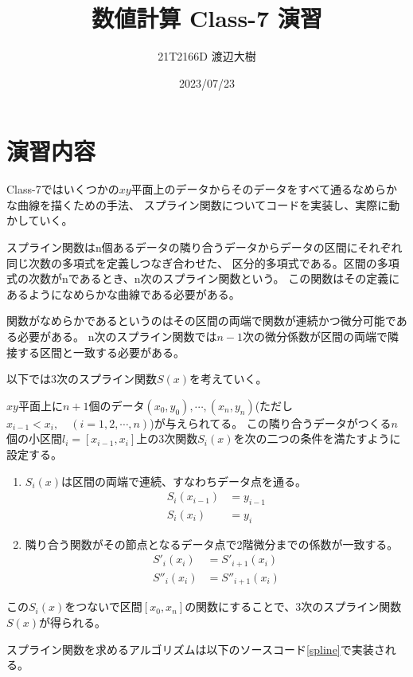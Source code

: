 \documentclass[a4paper,11pt,dvipdfmx]{jsarticle}
\begin{document}

\title{数値計算 Class-7 演習}
\author{21T2166D 渡辺大樹}
\date{2023/07/23}
\maketitle

\section{演習内容}
Class-7ではいくつかの$xy$平面上のデータからそのデータをすべて通るなめらかな曲線を描くための手法、
スプライン関数についてコードを実装し、実際に動かしていく。

スプライン関数はn個あるデータの隣り合うデータからデータの区間にそれぞれ同じ次数の多項式を定義しつなぎ合わせた、
区分的多項式である。区間の多項式の次数がnであるとき、n次のスプライン関数という。
この関数はその定義にあるようになめらかな曲線である必要がある。

関数がなめらかであるというのはその区間の両端で関数が連続かつ微分可能である必要がある。
n次のスプライン関数では$n-1$次の微分係数が区間の両端で隣接する区間と一致する必要がある。

以下では3次のスプライン関数$S(x)$を考えていく。

$xy$平面上に$n+1$個のデータ$(x_0,y_0),\cdots,(x_n,y_n)$(ただし$x_{i-1}<x_i,\quad(i=1,2,\cdots,n)$)が与えられてる。
この隣り合うデータがつくる$n$個の小区間$l_i=[x_{i-1},x_i]$上の3次関数$S_i(x)$を次の二つの条件を満たすように設定する。
\begin{enumerate}
    \item $S_i(x)$は区間の両端で連続、すなわちデータ点を通る。
    \begin{align*}
        S_i(x_{i-1}) & = y_{i-1}\\
        S_i(x_{i}) & = y_{i}
    \end{align*}
    \item 隣り合う関数がその節点となるデータ点で2階微分までの係数が一致する。
    \begin{align*}
        S'_i(x_i) & =S'_{i+1}(x_i) \\
        S''_i(x_i) & =S''_{i+1}(x_i)
    \end{align*}
\end{enumerate}

この$S_i(x)$をつないで区間$[x_0,x_n]$の関数にすることで、3次のスプライン関数$S(x)$が得られる。

スプライン関数を求めるアルゴリズムは以下のソースコード\ref{spline}で実装される。

\end{document}
